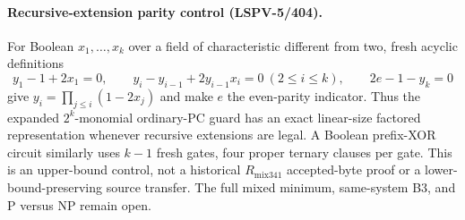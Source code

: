 \paragraph{Recursive-extension parity control (LSPV-5/404).}
For Boolean $x_1,\ldots,x_k$ over a field of characteristic different from two,
fresh acyclic definitions
\[
y_1-1+2x_1=0,\qquad
y_i-y_{i-1}+2y_{i-1}x_i=0\ (2\leq i\leq k),\qquad
2e-1-y_k=0
\]
give $y_i=\prod_{j\leq i}(1-2x_j)$ and make $e$ the even-parity indicator.
Thus the expanded $2^k$-monomial ordinary-PC guard has an exact linear-size
factored representation whenever recursive extensions are legal.  A Boolean
prefix-XOR circuit similarly uses $k-1$ fresh gates, four proper ternary clauses
per gate.  This is an upper-bound control, not a historical $R_{\mathrm{mix341}}$
accepted-byte proof or a lower-bound-preserving source transfer.  The full mixed
minimum, same-system B3, and P versus NP remain open.
